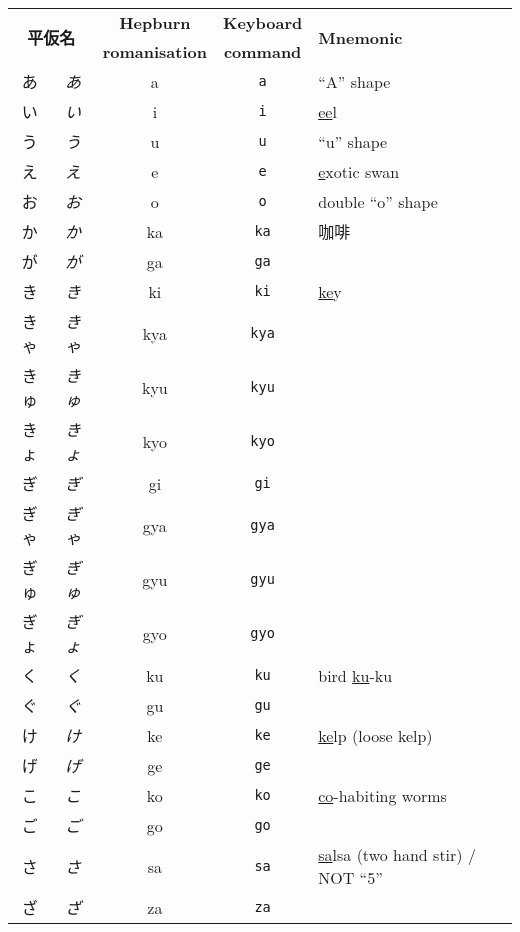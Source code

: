 \documentclass[../nihongo-gakushuu-kyouzai.tex]{subfiles}
\begin{document}
\begin{longtable}[c]{@{}ccccl@{}}
    \toprule
    \multicolumn{2}{c}{\multirow{2}{*}{\textbf{平仮名}}} & \textbf{Hepburn} & \textbf{Keyboard} & \multirow{2}{*}{\textbf{Mnemonic}} \\
    \multicolumn{2}{c}{} & \textbf{romanisation} & \textbf{command} & \\* \midrule
    あ & \emph{あ} & a & \texttt{a} & ``A'' shape \\
    い & \emph{い} & i & \texttt{i} & \ul{ee}l \\
    う & \emph{う} & u & \texttt{u} & ``u'' shape \\
    え & \emph{え} & e & \texttt{e} & \ul{e}xotic swan \\
    お & \emph{お} & o & \texttt{o} & double ``o'' shape \\
    か & \emph{か} & ka & \texttt{ka} & 咖啡 \\
    が & \emph{が} & ga & \texttt{ga} &  \\
    き & \emph{き} & ki & \texttt{ki} & \ul{ke}y \\
    きゃ & \emph{きゃ} & kya & \texttt{kya} &  \\
    きゅ & \emph{きゅ} & kyu & \texttt{kyu} &  \\
    きょ & \emph{きょ} & kyo & \texttt{kyo} &  \\
    ぎ & \emph{ぎ} & gi & \texttt{gi} &  \\
    ぎゃ & \emph{ぎゃ} & gya & \texttt{gya} &  \\
    ぎゅ & \emph{ぎゅ} & gyu & \texttt{gyu} &  \\
    ぎょ & \emph{ぎょ} & gyo & \texttt{gyo} &  \\
    く & \emph{く} & ku & \texttt{ku} & bird \ul{ku}-ku \\
    ぐ & \emph{ぐ} & gu & \texttt{gu} &  \\
    け & \emph{け} & ke & \texttt{ke} & \ul{ke}lp (loose kelp) \\
    げ & \emph{げ} & ge & \texttt{ge} &  \\
    こ & \emph{こ} & ko & \texttt{ko} & \ul{co}-habiting worms \\
    ご & \emph{ご} & go & \texttt{go} &  \\
    さ & \emph{さ} & sa & \texttt{sa} & \ul{sa}lsa (two hand stir) / NOT ``5'' \\
    ざ & \emph{ざ} & za & \texttt{za} &  \\

\end{longtable}
\end{document}
